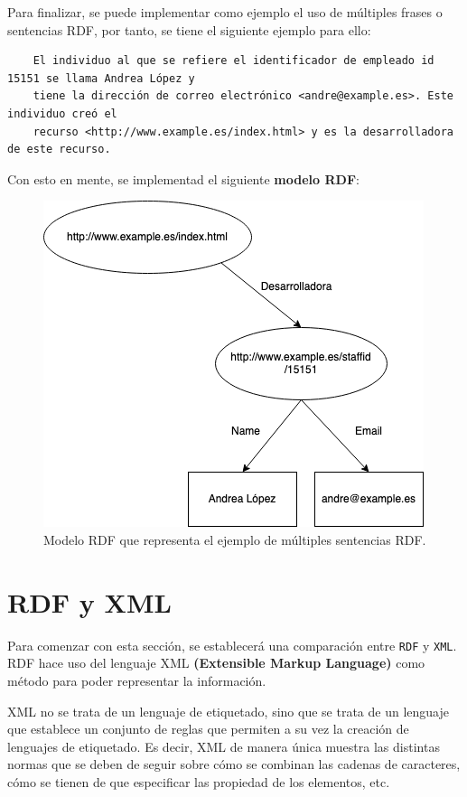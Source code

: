 \documentclass[11pt]{report}
\begin{document}
Para finalizar, se puede implementar como ejemplo el uso de múltiples frases o sentencias RDF, por tanto, se tiene el siguiente ejemplo para ello:

\begin{verbatim}
	El individuo al que se refiere el identificador de empleado id 15151 se llama Andrea López y 
	tiene la dirección de correo electrónico <andre@example.es>. Este individuo creó el 
	recurso <http://www.example.es/index.html> y es la desarrolladora de este recurso.
\end{verbatim}

Con esto en mente, se implementad el siguiente \textbf{modelo RDF}:

\begin{figure}[H]
	\centering
	\includegraphics[scale=0.7]{../img/Modelo-RDF.png}
	\caption{Modelo RDF que representa el ejemplo de múltiples sentencias RDF.}
	\label{fig:Modelo-RDF}
\end{figure}

	\chapter{RDF y XML}
	Para comenzar con esta sección,  se establecerá una comparación entre \texttt{RDF} y \texttt{XML}. RDF hace uso del lenguaje XML \textbf{(Extensible Markup Language)} como método para poder representar la información. 

	XML no se trata de un lenguaje de etiquetado, sino que se trata de un lenguaje que establece un conjunto de reglas que permiten a su vez la creación de lenguajes de etiquetado. Es decir, XML de manera única muestra las distintas normas que se deben de seguir sobre cómo se combinan las cadenas de caracteres, cómo se tienen de que especificar las propiedad de los elementos, etc. 
\end{document}
